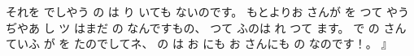 それを
でしやう
の
は
り
いても
ないのです。
もとよりお
さんが
を
つて
やうぢやあ
し
ツ
はまだ
の
なんですもの、
つて
ふのは
れ
つて
ます。
で
の
さんていふ
が
を
たのでしてネ、
の
は
お
にも
お
さんにも
の
なのです！。
』

